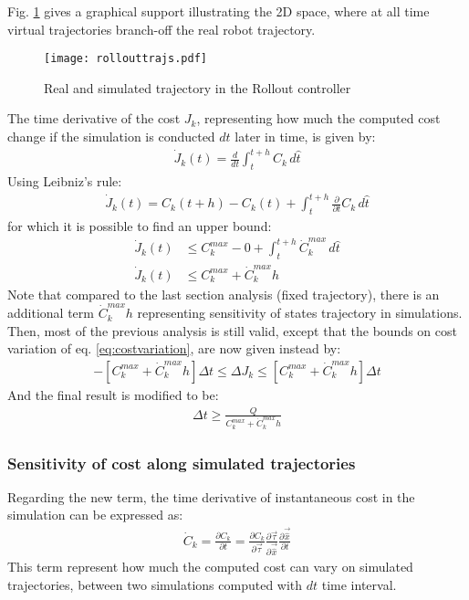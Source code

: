 Fig. \ref{fig:rollouttrajs} gives a graphical support illustrating the 2D space, where at all time virtual trajectories branch-off the real robot trajectory.
%
\begin{figure}[H]
	\centering
		\texttt{[image: rollouttrajs.pdf]}
	\caption{Real and simulated trajectory in the Rollout controller}
	\label{fig:rollouttrajs}
\end{figure}
%
The time derivative of the cost $J_k$, representing how much the computed cost change if the simulation is conducted $dt$ later in time, is given by:
%
\begin{align}
\dot{J}_k(t) = \frac{d}{dt} \int_{t}^{t+h}{  C_k \, d\hat{t} }
\end{align}
%
Using Leibniz's rule:
%
\begin{align}
\dot{J}_k(t) = C_k( t + h ) -  C_k( t ) +   \int_{t}^{t+h}{ \frac{\partial}{\partial t} C_k \, d\hat{t} }
\end{align}
%
for which it is possible to find an upper bound:
%
\begin{align}
\dot{J}_k(t) &\leq C_k^{max} -  0   +   \int_{t}^{t+h}{ \dot{C}_k^{max} \, d\hat{t} }  \\
\dot{J}_k(t) &\leq C_k^{max}  +   \dot{C}_k^{max} h
\end{align}
%
Note that compared to the last section analysis (fixed trajectory), there is an additional term  $\dot{C}_k^{max} h$ representing sensitivity of states trajectory in simulations. Then, most of the previous analysis is still valid, except that the bounds on cost variation of eq. \eqref{eq:costvariation}, are now given instead by:
%
\begin{align}
-\left[ C_k^{max}  +   \dot{C}_k^{max} h \right] \Delta t  \leq \Delta J_k \leq \left[ C_k^{max}  +   \dot{C}_k^{max} h \right] \Delta t
\label{eq:costvariationnew}
\end{align}
%
And the final result is modified to be:
%
\begin{align}
\Delta t \geq \frac{Q}{ C_k^{max}  +   \dot{C}_k^{max} h }
\end{align}
%

\subsubsection{Sensitivity of cost along simulated trajectories}
%
Regarding the new term, the time derivative of instantaneous cost in the simulation can be expressed as:
%
\begin{align}
\dot{C}_k    = \frac{\partial C_k}{\partial t} = \frac{\partial C_k}{\partial \vec{\tau}} \frac{\partial \vec{\tau}}{\partial \vec{\hat{x}}} \frac{\partial \vec{\hat{x}}}{\partial t} 
\end{align}
%
This term represent how much the computed cost can vary on simulated trajectories, between two simulations computed with $dt$ time interval. 

